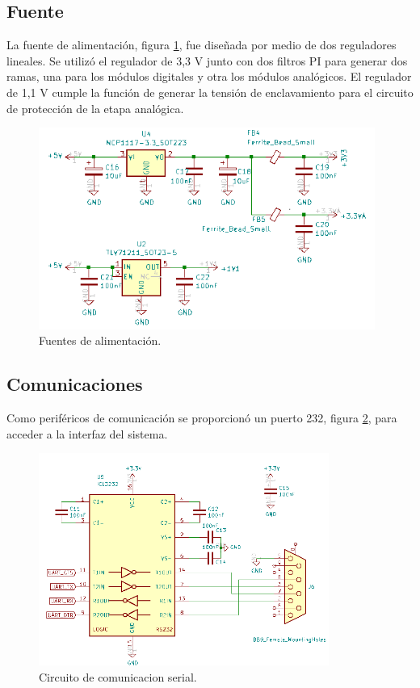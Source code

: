 \subsection{Fuente}

La fuente de alimentación, figura \ref{fig:schPwr}, fue diseñada por medio de dos reguladores lineales. Se utilizó el regulador de 3,3 V junto con dos filtros PI para generar dos ramas, una para los módulos digitales y otra los módulos analógicos. El regulador de 1,1 V cumple la función de generar la tensión de enclavamiento para el circuito de protección de la etapa analógica.


\begin{figure}[ht]
	\centering
	\includegraphics[width=110mm]{./Figures/schPwr.png}
	\caption{Fuentes de alimentación.}
	\label{fig:schPwr}
\end{figure}

\vspace{5mm}

\subsection{Comunicaciones}

Como periféricos de comunicación se proporcionó un puerto 232, figura \ref{fig:schSerial}, para acceder a la interfaz del sistema. 

\begin{figure}[ht]
	\centering
	\includegraphics[width=95mm]{./Figures/schSerial.png}
	\caption{Circuito de comunicacion serial.}
	\label{fig:schSerial}
\end{figure}

